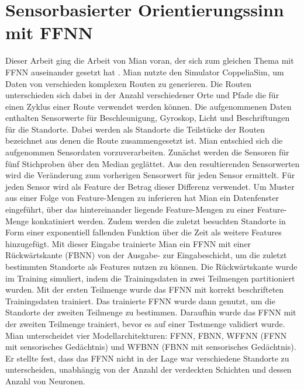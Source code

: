 \section{Sensorbasierter Orientierungssinn mit FFNN}
Dieser Arbeit ging die Arbeit von Mian voran, der sich zum gleichen Thema mit FFNN auseinander gesetzt hat \cite{naveedThesis}.
Mian nutzte den Simulator CoppeliaSim, um Daten von verschieden komplexen Routen zu generieren.
Die Routen unterschieden sich dabei in der Anzahl verschiedener Orte und Pfade die für einen Zyklus einer Route verwendet werden können.
Die aufgenommenen Daten enthalten Sensorwerte für Beschleunigung, Gyroskop, Licht und Beschriftungen für die Standorte.
Dabei werden als Standorte die Teilstücke der Routen bezeichnet aus denen die Route zusammengesetzt ist.
\newline
\newline
Mian entschied sich die aufgenommen Sensordaten vorzuverarbeiten.
Zunächst werden die Sensoren für fünf Stichproben über den Median geglättet.
Aus den resultierenden Sensorwerten wird die Veränderung zum vorherigen Sensorwert für jeden Sensor ermittelt.
Für jeden Sensor wird als Feature der Betrag dieser Differenz verwendet.
Um Muster aus einer Folge von Feature-Mengen zu inferieren hat Mian ein Datenfenster eingeführt, über das
hintereinander liegende Feature-Mengen zu einer Feature-Menge konkatiniert werden.
Zudem werden die zuletzt besuchten Standorte in Form einer exponentiell fallenden Funktion über die Zeit als weitere Features hinzugefügt.
\newpage
Mit dieser Eingabe trainierte Mian ein FFNN mit einer Rückwärtskante (FBNN) von der Ausgabe- zur Eingabeschicht,
um die zuletzt bestimmten Standorte als Features nutzen zu können.
Die Rückwärtskante wurde im Training simuliert, indem die Trainingsdaten in zwei Teilmengen partitioniert wurden.
Mit der ersten Teilmenge wurde das FFNN mit korrekt beschrifteten Trainingsdaten trainiert.
Das trainierte FFNN wurde dann genutzt, um die Standorte der zweiten Teilmenge zu bestimmen.
Daraufhin wurde das FFNN mit der zweiten Teilmenge trainiert, bevor es auf einer Testmenge validiert wurde.
\newline
\newline
Mian unterscheidet vier Modellarchitekturen: FFNN, FBNN, WFFNN (FFNN mit sensorisches Gedächtnis) und WFBNN (FBNN mit sensorisches Gedächtnis).
Er stellte fest, dass das FFNN nicht in der Lage war verschiedene Standorte zu unterscheiden,
unabhängig von der Anzahl der verdeckten Schichten und dessen Anzahl von Neuronen.
\newline

